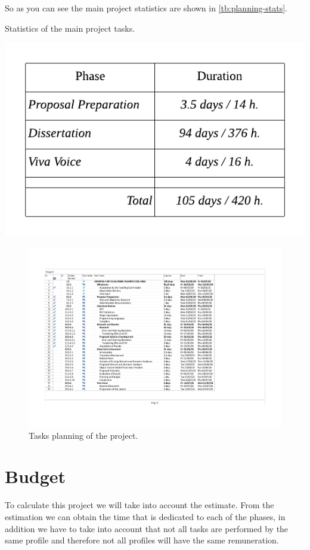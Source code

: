 \bigskip
So as you can see the main project statistics are shown in \cref{tb:planning-stats}.

\begin{table}
    \caption[Statistics of the main project tasks]{Statistics of the main project tasks.}
    \label{tb:planning-stats}
    \centering
    \includegraphics{images/planning-stats.pdf}
\end{table}

\begin{figure}
    \includegraphics[width=\textwidth]{images/planificacion.pdf}
    \centering
	\caption[Tasks planning of the project]{Tasks planning of the project.}
    \label{fig:planning-sheet}
\end{figure}

\section{Budget}
To calculate this project we will take into account the estimate. From the estimation we can obtain
the time that is dedicated to each of the phases, in addition we have to take into account that not
all tasks are performed by the same profile and therefore not all profiles will have the same remuneration.